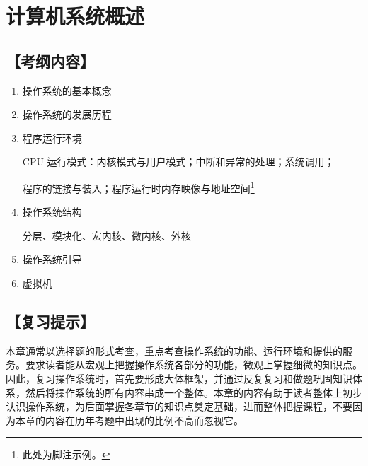 \documentclass{ctexbook}
\theoremstyle{remark}
\begin{document}
	
	\chapter{计算机系统概述}
	
	\section*{【考纲内容】}
	
	\begin{enumerate}
		\item 操作系统的基本概念
		\item 操作系统的发展历程
		\item 程序运行环境
		
		
CPU 运行模式：内核模式与用户模式；中断和异常的处理；系统调用；
		
程序的链接与装入；程序运行时内存映像与地址空间\footnote{此处为脚注示例。}
		
		\item 操作系统结构
		
		
分层、模块化、宏内核、微内核、外核
		
		\item 操作系统引导
		\item 虚拟机
	\end{enumerate}
	
	\section*{【复习提示】}
	
	本章通常以选择题的形式考查，重点考查操作系统的功能、运行环境和提供的服务。要求读者能从宏观上把握操作系统各部分的功能，微观上掌握细微的知识点。因此，复习操作系统时，首先要形成大体框架，并通过反复复习和做题巩固知识体系，然后将操作系统的所有内容串成一个整体。本章的内容有助于读者整体上初步认识操作系统，为后面掌握各章节的知识点奠定基础，进而整体把握课程，不要因为本章的内容在历年考题中出现的比例不高而忽视它。
	
\end{document}
